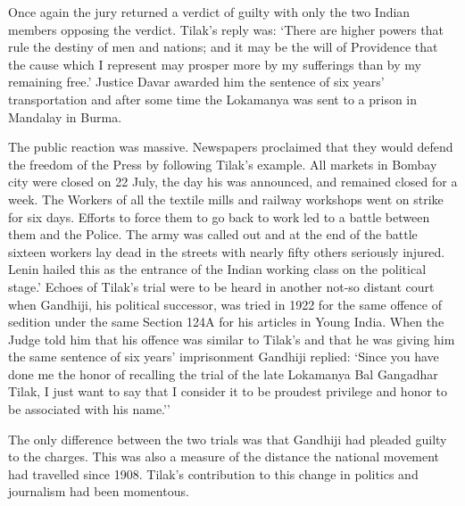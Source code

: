 Once again the jury returned a verdict of guilty with only the two Indian members opposing the verdict. Tilak's reply was: `There are higher powers that rule the destiny of men and nations; and it may be the will of Providence that the cause which I represent may prosper more by my sufferings than by my remaining free.' Justice Davar awarded him the sentence of six years' transportation and after some time the Lokamanya was sent to a prison in Mandalay in Burma.

The public reaction was massive. Newspapers proclaimed that they would defend the freedom of the Press by following Tilak's example. All markets in Bombay city were closed on 22 July, the day his was announced, and remained closed for a week. The Workers of all the textile mills and railway workshops went on strike for six days. Efforts to force them to go back to work led to a battle between them and the Police. The army was called out and at the end of the battle sixteen workers lay dead in the streets with nearly fifty others seriously injured. Lenin hailed this as the entrance of the Indian working class on the political stage.' Echoes of Tilak's trial were to be heard in another not-so­ distant court when Gandhiji, his political successor, was tried in 1922 for the same offence of sedition under the same Section 124A for his articles in Young India. When the Judge told him that his offence was similar to Tilak's and that he was giving him the same sentence of six years' imprisonment Gandhiji replied: `Since you have done me the honor of recalling the trial of the late Lokamanya Bal Gangadhar Tilak, I just want to say that I consider it to be proudest privilege and honor to be associated with his name.''

The only difference between the two trials was that Gandhiji had pleaded guilty to the charges. This was also a measure of the distance the national movement had travelled since 1908. Tilak's contribution to this change in politics and journalism had been momentous.
